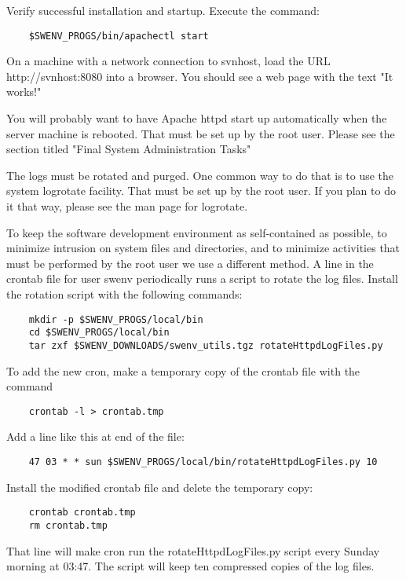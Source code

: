 Verify successful installation and startup.  Execute the command:
\begin{verbatim}
    $SWENV_PROGS/bin/apachectl start
\end{verbatim}
On a machine with a network connection to svnhost, load the URL
http://svnhost:8080 into a browser.  You should see a web page with the
text "It works!"

You will probably want to have Apache httpd start up automatically
when the server machine is rebooted.  That must be set up by the
root user.  Please see the section titled "Final System Administration
Tasks"

The logs must be rotated and purged.  One common way to do
that is to use the system logrotate facility.  That must be
set up by the root user.  If you plan to do it that way,
please see the man page for logrotate.  

To keep the software development environment as
self-contained as possible, to minimize intrusion on system
files and directories, and to minimize activities that must
be performed by the root user we use a different method.
A line in the crontab file for user swenv
periodically runs a script to rotate the log files.  Install
the rotation script with the following commands:
\begin{verbatim}
    mkdir -p $SWENV_PROGS/local/bin
    cd $SWENV_PROGS/local/bin
    tar zxf $SWENV_DOWNLOADS/swenv_utils.tgz rotateHttpdLogFiles.py
\end{verbatim}

To add the new cron, make a temporary copy of the crontab file with 
the command
\begin{verbatim}
    crontab -l > crontab.tmp
\end{verbatim}
Add a line like this at end of the file:
\begin{verbatim}
    47 03 * * sun $SWENV_PROGS/local/bin/rotateHttpdLogFiles.py 10
\end{verbatim}

Install the modified crontab file and delete the temporary copy:
\begin{verbatim}
    crontab crontab.tmp
    rm crontab.tmp
\end{verbatim}

That line will make cron run the rotateHttpdLogFiles.py
script every Sunday morning at 03:47.  The script will keep
ten compressed copies of the log files.  


